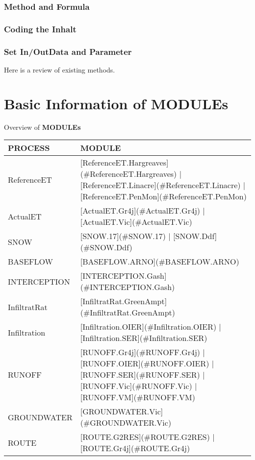 \documentclass[
]{book}
\begin{document}
\hypertarget{method-and-formula}{%
\subsection{Method and Formula}\label{method-and-formula}}

\hypertarget{coding-the-inhalt}{%
\subsection{Coding the Inhalt}\label{coding-the-inhalt}}

\hypertarget{set-inoutdata-and-parameter}{%
\subsection{Set In/OutData and Parameter}\label{set-inoutdata-and-parameter}}

Here is a review of existing methods.

\hypertarget{module}{%
\chapter{Basic Information of MODULEs}\label{module}}

Overview of \textbf{MODULEs}

\begin{table}[!h]
\centering
\begin{tabular}{l|l}
\hline
PROCESS & MODULE\\
\hline
ReferenceET & [ReferenceET.Hargreaves](\#ReferenceET.Hargreaves) | [ReferenceET.Linacre](\#ReferenceET.Linacre) | [ReferenceET.PenMon](\#ReferenceET.PenMon)\\
\cline{1-2}
ActualET & [ActualET.Gr4j](\#ActualET.Gr4j) | [ActualET.Vic](\#ActualET.Vic)\\
\cline{1-2}
SNOW & [SNOW.17](\#SNOW.17) | [SNOW.Ddf](\#SNOW.Ddf)\\
\cline{1-2}
BASEFLOW & [BASEFLOW.ARNO](\#BASEFLOW.ARNO)\\
\cline{1-2}
INTERCEPTION & [INTERCEPTION.Gash](\#INTERCEPTION.Gash)\\
\cline{1-2}
InfiltratRat & [InfiltratRat.GreenAmpt](\#InfiltratRat.GreenAmpt)\\
\cline{1-2}
Infiltration & [Infiltration.OIER](\#Infiltration.OIER) | [Infiltration.SER](\#Infiltration.SER)\\
\cline{1-2}
RUNOFF & [RUNOFF.Gr4j](\#RUNOFF.Gr4j) | [RUNOFF.OIER](\#RUNOFF.OIER) | [RUNOFF.SER](\#RUNOFF.SER) | [RUNOFF.Vic](\#RUNOFF.Vic) | [RUNOFF.VM](\#RUNOFF.VM)\\
\cline{1-2}
GROUNDWATER & [GROUNDWATER.Vic](\#GROUNDWATER.Vic)\\
\cline{1-2}
ROUTE & [ROUTE.G2RES](\#ROUTE.G2RES) | [ROUTE.Gr4j](\#ROUTE.Gr4j)\\
\hline
\end{tabular}
\end{table}
\end{document}
